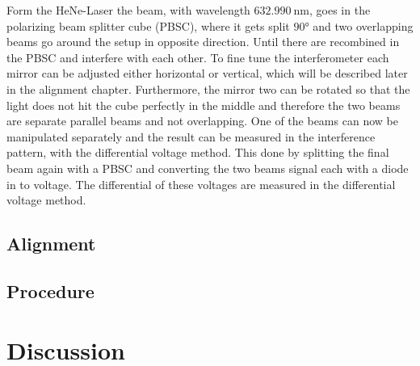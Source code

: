 Form the HeNe-Laser the beam, with wavelength $\qty{632.990}{\nano\meter}$, goes in the polarizing beam splitter cube (PBSC), 
where it gets split $90°$ and two overlapping beams go around the setup in opposite direction. 
Until there are recombined in the PBSC and interfere with each other. 
To fine tune the interferometer each mirror can be adjusted either horizontal or vertical, which will be described later in the alignment chapter.
Furthermore, the mirror two can be rotated so that the light does not hit the cube perfectly in the middle 
and therefore the two beams are separate parallel beams and not overlapping. 
One of the beams can now be manipulated separately and the result can be measured in the interference pattern, with the differential voltage method. 
This done by splitting the final beam again with a PBSC and converting the two beams signal each with a diode in to voltage. 
The differential of these voltages are measured in the differential voltage method.

\subsection{Alignment}

\subsection{Procedure}

\newpage



\section{Discussion}


\newpage
\printbibliography

